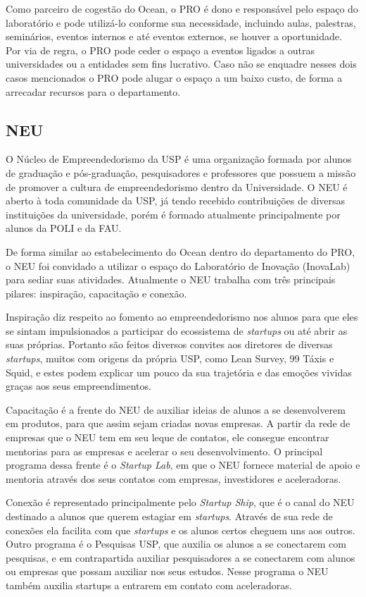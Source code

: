 Como parceiro de cogestão do Ocean, o PRO é dono e responsável pelo espaço do laboratório e pode utilizá-lo conforme sua necessidade, incluindo aulas, palestras, seminários, eventos internos e até eventos externos, se houver a oportunidade. Por via de regra, o PRO pode ceder o espaço a eventos ligados a outras universidades ou a entidades sem fins lucrativo. Caso não se enquadre nesses dois casos mencionados o PRO pode alugar o espaço a um baixo custo, de forma a arrecadar recursos para o departamento.

\subsection{NEU}
\label{sec:con_neu}

O Núcleo de Empreendedorismo da USP é uma organização formada por alunos de graduação e pós-graduação, pesquisadores e professores que possuem a missão de promover a cultura de empreendedorismo dentro da Universidade. O NEU é aberto à toda comunidade da USP, já tendo recebido contribuições de diversas instituições da universidade, porém é formado atualmente principalmente por alunos da POLI e da FAU.

De forma similar ao estabelecimento do Ocean dentro do departamento do PRO, o NEU foi convidado a utilizar o espaço do Laboratório de Inovação (InovaLab) para sediar suas atividades. Atualmente o NEU trabalha com três principais pilares: inspiração, capacitação e conexão.

Inspiração diz respeito ao fomento ao empreendedorismo nos alunos para que eles se sintam impulsionados a participar do ecossistema de \textit{startups} ou até abrir as suas próprias. Portanto são feitos diversos convites aos diretores de diversas \textit{startups}, muitos com origens da própria USP, como Lean Survey, 99 Táxis e Squid, e estes podem explicar um pouco da sua trajetória e das emoções vividas graças aos seus empreendimentos. 

Capacitação é a frente do NEU de auxiliar ideias de alunos a se desenvolverem em produtos, para que assim sejam criadas novas empresas. A partir da rede de empresas que o NEU tem em seu leque de contatos, ele consegue encontrar mentorias para as empresas e acelerar o seu desenvolvimento. O principal programa dessa frente é o \textit{Startup Lab}, em que o NEU fornece material de apoio e mentoria através dos seus contatos com empresas, investidores e aceleradoras.

Conexão é representado principalmente pelo \textit{Startup Ship}, que é o canal do NEU destinado a alunos que querem estagiar em \textit{startups}. Através de sua rede de conexões ela facilita com que \textit{startups} e os alunos certos cheguem uns aos outros. Outro programa é o Pesquisas USP, que auxilia os alunos a se conectarem com pesquisas, e em contrapartida auxiliar pesquisadores a se conectarem com alunos ou empresas que possam auxiliar nos seus estudos. Nesse programa o NEU também auxilia startups a entrarem em contato com aceleradoras.

